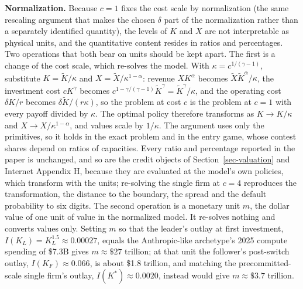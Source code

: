 \documentclass[
  11pt,
  letterpaper,
]{scrartcl}
\begin{document}
\textbf{Normalization.} Because \(c = 1\) fixes the cost scale by
normalization (the same rescaling argument that makes the chosen
\(\delta\) part of the normalization rather than a separately identified
quantity), the levels of \(K\) and \(X\) are not interpretable as
physical units, and the quantitative content resides in ratios and
percentages. Two operations that both bear on units should be kept
apart. The first is a change of the cost scale, which re-solves the
model. With \(\kappa = c^{1/(\gamma-1)}\), substitute
\(K = \tilde{K}/\kappa\) and \(X = \tilde{X}/\kappa^{1-\alpha}\):
revenue \(X K^\alpha\) becomes \(\tilde{X}\tilde{K}^\alpha/\kappa\), the
investment cost \(cK^\gamma\) becomes
\(c^{1-\gamma/(\gamma-1)}\tilde{K}^\gamma = \tilde{K}^\gamma/\kappa\),
and the operating cost \(\delta K/r\) becomes
\(\delta\tilde{K}/(r\kappa)\), so the problem at cost \(c\) is the
problem at \(c = 1\) with every payoff divided by \(\kappa\). The
optimal policy therefore transforms as \(K \to K/\kappa\) and
\(X \to X/\kappa^{1-\alpha}\), and values scale by \(1/\kappa\). The
argument uses only the primitives, so it holds in the exact problem and
in the entry game, whose contest shares depend on ratios of capacities.
Every ratio and percentage reported in the paper is unchanged, and so
are the credit objects of Section~\ref{sec-valuation} and Internet
Appendix H, because they are evaluated at the model's own policies,
which transform with the units; re-solving the single firm at \(c = 4\)
reproduces the transformation, the distance to the boundary, the spread
and the default probability to six digits. The second operation is a
monetary unit \(m\), the dollar value of one unit of value in the
normalized model. It re-solves nothing and converts values only. Setting
\(m\) so that the leader's outlay at first investment,
\(I(K_L) = K_L^{1.5} \approx 0.00027\), equals the Anthropic-like
archetype's 2025 compute spending of \$7.3B gives \(m \approx \$27\)
trillion; at that unit the follower's post-switch outlay,
\(I(K_F) \approx 0.066\), is about \$1.8 trillion, and matching the
precommitted-scale single firm's outlay, \(I(K^*) \approx 0.0020\),
instead would give \(m \approx \$3.7\) trillion.
\end{document}
